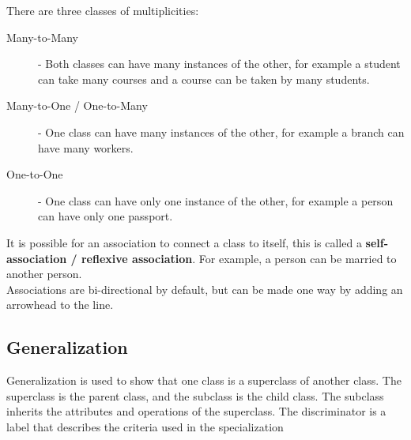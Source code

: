 \documentclass[12pt letter]{report}
\begin{document}
There are three classes of multiplicities:
\begin{description}
  \item[Many-to-Many] - Both classes can have many instances of the other, for example a student can take many courses and a course can be taken by many students.
  \item[Many-to-One / One-to-Many] - One class can have many instances of the other, for example a branch can have many workers.
  \item[One-to-One] - One class can have only one instance of the other, for example a person can have only one passport.
\end{description}

It is possible for an association to connect a class to itself, this is called a \textbf{self-association / reflexive association}. For example, a person can be married to another person. \\


Associations are bi-directional by default, but can be made one way by adding an arrowhead to the line. \\

\subsection{Generalization}
Generalization is used to show that one class is a superclass of another class. The superclass is the parent class, and the subclass is the child class. The subclass inherits the attributes and operations of the superclass. The discriminator is a label that describes the criteria used in the specialization \\
\end{document}
